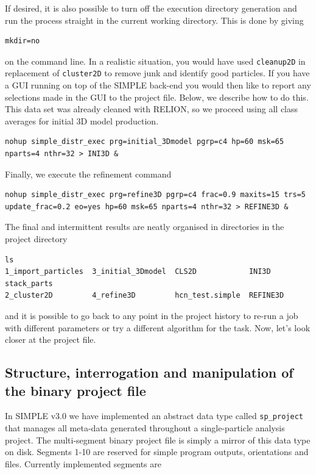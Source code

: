 \documentclass[a4paper,11pt]{article}
\newcommand{\prgname}[1]{\textcolor{NavyBlue}{\texttt{#1}}}
\begin{document}
\noindent{}If desired, it is also possible to turn off the execution directory generation and run the process straight in the current working directory. This is done by giving

\begin{Verbatim}[commandchars=+\[\],fontsize=\small,breaklines=true]
mkdir=no
\end{Verbatim}

\noindent{}on the command line. In a realistic situation, you would have used \prgname{cleanup2D} in replacement of \prgname{cluster2D} to remove junk and identify good particles. If you have a GUI running on top of the SIMPLE back-end you would then like to report any selections made in the GUI to the project file. Below, we describe how to do this. This data set was already cleaned with RELION, so we proceed using all class averages for initial 3D model production.

\begin{Verbatim}[commandchars=+\[\],fontsize=\small,breaklines=true]
nohup simple_distr_exec prg=initial_3Dmodel pgrp=c4 hp=60 msk=65 nparts=4 nthr=32 > INI3D &
\end{Verbatim}

\noindent{}Finally, we execute the refinement command

\begin{Verbatim}[commandchars=+\[\],fontsize=\small,breaklines=true]
nohup simple_distr_exec prg=refine3D pgrp=c4 frac=0.9 maxits=15 trs=5 update_frac=0.2 eo=yes hp=60 msk=65 nparts=4 nthr=32 > REFINE3D &
\end{Verbatim}

\noindent{}The final and intermittent results are neatly organised in directories in the project directory

\begin{Verbatim}[commandchars=+\[\],fontsize=\small,breaklines=true]
ls
1_import_particles  3_initial_3Dmodel  CLS2D            INI3D     stack_parts
2_cluster2D         4_refine3D         hcn_test.simple  REFINE3D
\end{Verbatim}

\noindent{}and it is possible to go back to any point in the project history to re-run a job with different parameters or try a different algorithm for the task. Now, let's look closer at the project file.

\subsection{Structure, interrogation and manipulation of the binary project file}
In SIMPLE v3.0 we have implemented an abstract data type called \texttt{sp\_project} that manages all meta-data generated throughout a single-particle analysis project. The multi-segment binary project file is simply a mirror of this data type on disk. Segments 1-10 are reserved  for simple program outputs, orientations and files. Currently implemented segments are
\end{document}
